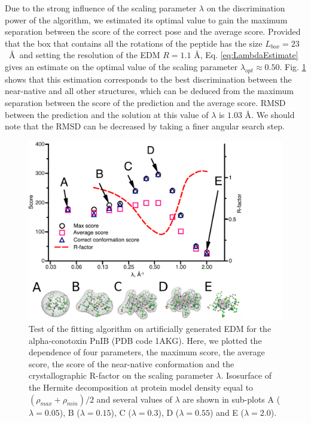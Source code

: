 Due to the strong influence of the scaling parameter $\lambda$ on the discrimination power of the algorithm,
we estimated its optimal value to gain the maximum separation between the score of the correct pose and the average score. 
%
Provided that the box that contains all the rotations of the peptide has the size $L_{box}=23$~\AA~and setting the resolution of the 
EDM $R=1.1$ {\AA}, Eq. \ref{eq:LambdaEstimate} gives an estimate on the optimal value of the scaling parameter $\lambda_{opt}\approx0.50$.
%
Fig. \ref{fig:test1AKG} shows
that this estimation corresponds to the best discrimination
between the near-native and all other structures, which can be deduced
from the maximum separation between the score of the prediction and
the average score. 
RMSD between the prediction and the solution at this value of $\lambda$ is $1.03$ \AA .
%
We should note that the RMSD can be  decreased by taking a finer angular search step.


\begin{figure}[h]
\label{fig:test1AKG}
\begin{centering}
\includegraphics[width=1\textwidth]{Hermite/Fig/ScoreDescriminationVsLambdaAndRFactor-rev.pdf}
\par\end{centering}
\caption[Results for the alpha-conotoxin PnIB]{Test of the fitting algorithm on artificially generated EDM for the alpha-conotoxin PnIB (PDB code 1AKG).
Here, we plotted the dependence of four parameters, the maximum score, the average score, the score of the near-native conformation and the crystallographic R-factor on the scaling
parameter $\lambda$. 
Isosurface of the Hermite decomposition at protein model density equal to $ (\rho_{max}+\rho_{min})/2 $ and several values of $\lambda$ are shown in sub-plots A ($\lambda=0.05$),
B ($\lambda=0.15$), C ($\lambda=0.3$), D ($\lambda=0.55$) and E ($\lambda=2.0$). }
\end{figure}

